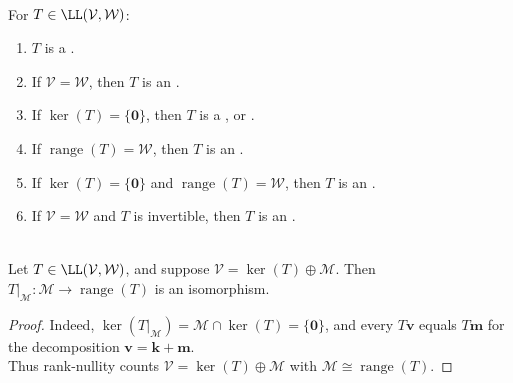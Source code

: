 \begin{definition} \label{def:linear-map-morphism-terminology-vector-spaces} \\
For $T\in\LL(\mathcal{V},\mathcal{W})$:
\begin{enumerate}[label=(\roman*)]
\setlength{\itemsep}{0pt}
\item $T$ is a .
\item If $\mathcal{V}=\mathcal{W}$, then $T$ is an .
\item If $\ker(T)=\{\mathbf{0}\}$, then $T$ is a , or .
\item If $\operatorname{range}(T)=\mathcal{W}$, then $T$ is an .
\item If $\ker(T)=\{\mathbf{0}\}$ and $\operatorname{range}(T)=\mathcal{W}$, then $T$ is an .
\item If $\mathcal{V}=\mathcal{W}$ and $T$ is invertible, then $T$ is an .
\end{enumerate}
\end{definition}

\begin{proposition} \label{prop:rank-nullity-complement-view} \\
Let $T\in\LL(\mathcal{V},\mathcal{W})$, and suppose $\mathcal{V}=\ker(T)\oplus\mathcal{M}$. Then $T|_{\mathcal{M}}:\mathcal{M}\to\operatorname{range}(T)$ is an isomorphism.
\begin{proof}
Indeed, $\ker(T|_{\mathcal{M}})=\mathcal{M}\cap\ker(T)=\{\mathbf{0}\}$, and every $T\mathbf{v}$ equals $T\mathbf{m}$ for the decomposition $\mathbf{v}=\mathbf{k}+\mathbf{m}$.\\
Thus rank-nullity counts $\mathcal{V}=\ker(T)\oplus\mathcal{M}$ with $\mathcal{M}\cong\operatorname{range}(T)$.
\end{proof}
\end{proposition}

